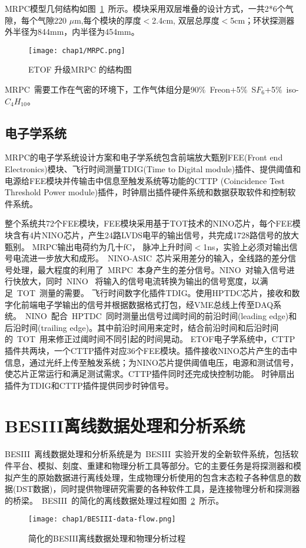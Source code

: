 MRPC模型几何结构如图~\ref{fig:MRPC}~所示。模块采用双层堆叠的设计方式，一共2*6个气隙，每个气隙220 $\mu$m,每个模块的厚度$<$2.4cm, 双层总厚度$<$5cm；环状探测器外半径为844mm，内半径为454mm。
\begin{figure}[!h]
  \centering
  \texttt{[image: chap1/MRPC.png]}
  \caption{ETOF 升级MRPC 的结构图}
  \label{fig:MRPC}
\end{figure}

MRPC~需要工作在气密的环境下，工作气体组分是90$\%$~Freon+5$\%$~S$F_{6}$+5$\%$~iso-$C_{4}H_{10}$。
\subsection{电子学系统}

MRPC的电子学系统设计方案和电子学系统包含前端放大甄别FEE(Front end Electronics)模块、飞行时间测量TDIG(Time to Digital module)插件、提供阈值和电源给FEE模块并传输击中信息至触发系统等功能的CTTP (Coincidence Test Threshold Power module)插件，时钟扇出插件硬件系统和数据获取软件和控制软件系统。

整个系统共72个FEE模块，FEE模块采用基于TOT技术的NINO芯片，每个FEE模块含有4片NINO芯片，产生24路LVDS电平的输出信号，共完成1728路信号的放大甄别。
MRPC输出电荷约为几十fC， 脉冲上升时间$<$1ns，实验上必须对输出信号电流进一步放大和成形。~NINO-ASIC~芯片采用差分的输入，全线路的差分信号处理，最大程度的利用了~MRPC~本身产生的差分信号。NINO~对输入信号进行快放大，同时~NINO~ 将输入的信号电流转换为输出的信号宽度，以满足~TOT~测量的需要。
飞行时间数字化插件TDIG。使用HPTDC芯片，接收和数字化前端电子学输出的信号并根据数据格式打包，经VME总线上传至DAQ系统。~NINO~配合~HPTDC~同时测量出信号过阈时间的前沿时间(leading edge)和后沿时间(trailing edge)。其中前沿时间用来定时，结合前沿时间和后沿时间的~TOT~用来修正过阈时间不同引起的时间晃动。
ETOF电子学系统中，CTTP插件共两块，一个CTTP插件对应36个FEE模块。插件接收NINO芯片产生的击中信息，通过光纤上传至触发系统；为NINO芯片提供阈值电压，电源和测试信号，使芯片正常运行和满足测试需求。CTTP插件同时还完成快控制功能。
时钟扇出插件为TDIG和CTTP插件提供同步时钟信号。

\section{BESIII离线数据处理和分析系统}
BESIII~离线数据处理和分析系统是为~BESIII~实验开发的全新软件系统，包括软件平台、模拟、刻度、重建和物理分析工具等部分。它的主要任务是将探测器和模拟产生的原始数据进行离线处理，生成物理分析使用的包含末态粒子各种信息的数据(DST数据)，同时提供物理研究需要的各种软件工具，是连接物理分析和探测器的桥梁。~BESIII~的简化的离线数据处理过程如图~\ref{fig:BESIII-data-flow}~所示。
\begin{figure}[!h]
  \centering
  \texttt{[image: chap1/BESIII-data-flow.png]}
  \caption{简化的BESIII离线数据处理和物理分析过程}
  \label{fig:BESIII-data-flow}
\end{figure}

